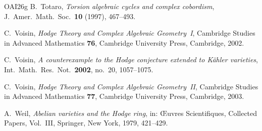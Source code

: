 \begin{thebibliography}{OAI26g}
B.~Totaro, \emph{Torsion algebraic cycles and complex cobordism}, J.\
Amer.\ Math.\ Soc.\ \textbf{10} (1997), 467--493.

C.~Voisin, \emph{Hodge Theory and Complex Algebraic Geometry~I}, Cambridge
Studies in Advanced Mathematics \textbf{76}, Cambridge University Press,
Cambridge, 2002.

C.~Voisin, \emph{A counterexample to the Hodge conjecture extended to
K\"ahler varieties}, Int.\ Math.\ Res.\ Not.\ \textbf{2002}, no.~20,
1057--1075.

C.~Voisin, \emph{Hodge Theory and Complex Algebraic Geometry~II}, Cambridge
Studies in Advanced Mathematics \textbf{77}, Cambridge University Press,
Cambridge, 2003.

A.~Weil, \emph{Abelian varieties and the Hodge ring}, in: \OE uvres
Scientifiques, Collected Papers, Vol.~III, Springer, New York, 1979,
421--429.

\end{thebibliography}

